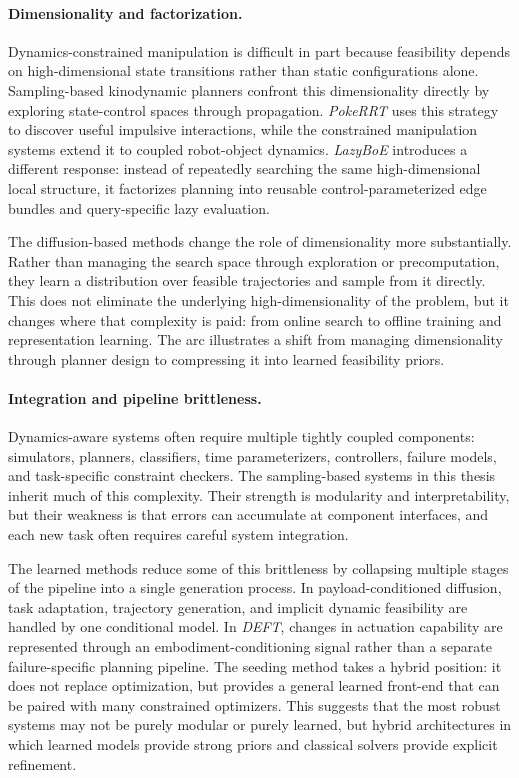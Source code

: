 \paragraph{Dimensionality and factorization.}
Dynamics-constrained manipulation is difficult in part because feasibility depends on high-dimensional state transitions rather than static configurations alone.
Sampling-based kinodynamic planners confront this dimensionality directly by exploring state-control spaces through propagation.
\textit{PokeRRT} uses this strategy to discover useful impulsive interactions, while the constrained manipulation systems extend it to coupled robot-object dynamics.
\textit{LazyBoE} introduces a different response: instead of repeatedly searching the same high-dimensional local structure, it factorizes planning into reusable control-parameterized edge bundles and query-specific lazy evaluation.

The diffusion-based methods change the role of dimensionality more substantially.
Rather than managing the search space through exploration or precomputation, they learn a distribution over feasible trajectories and sample from it directly.
This does not eliminate the underlying high-dimensionality of the problem, but it changes where that complexity is paid: from online search to offline training and representation learning.
The arc illustrates a shift from managing dimensionality through planner design to compressing it into learned feasibility priors.

\paragraph{Integration and pipeline brittleness.}
Dynamics-aware systems often require multiple tightly coupled components: simulators, planners, classifiers, time parameterizers, controllers, failure models, and task-specific constraint checkers.
The sampling-based systems in this thesis inherit much of this complexity.
Their strength is modularity and interpretability, but their weakness is that errors can accumulate at component interfaces, and each new task often requires careful system integration.

The learned methods reduce some of this brittleness by collapsing multiple stages of the pipeline into a single generation process.
In payload-conditioned diffusion, task adaptation, trajectory generation, and implicit dynamic feasibility are handled by one conditional model.
In \textit{DEFT}, changes in actuation capability are represented through an embodiment-conditioning signal rather than a separate failure-specific planning pipeline.
The seeding method takes a hybrid position: it does not replace optimization, but provides a general learned front-end that can be paired with many constrained optimizers.
This suggests that the most robust systems may not be purely modular or purely learned, but hybrid architectures in which learned models provide strong priors and classical solvers provide explicit refinement.

